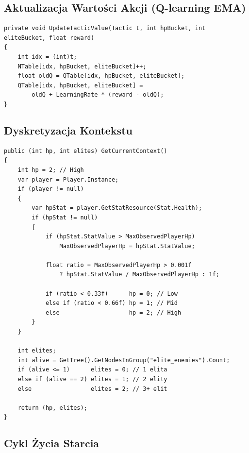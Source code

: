 \subsection{Aktualizacja Wartości Akcji (Q-learning EMA)}

\begin{lstlisting}[caption={EliteBrain.UpdateTacticValue},label={lst:eb-update}]
private void UpdateTacticValue(Tactic t, int hpBucket, int eliteBucket, float reward)
{
    int idx = (int)t;
    NTable[idx, hpBucket, eliteBucket]++;
    float oldQ = QTable[idx, hpBucket, eliteBucket];
    QTable[idx, hpBucket, eliteBucket] =
        oldQ + LearningRate * (reward - oldQ);
}
\end{lstlisting}

\subsection{Dyskretyzacja Kontekstu}

\begin{lstlisting}[caption={EliteBrain.GetCurrentContext - kubelki HP i liczby elit},label={lst:eb-ctx}]
public (int hp, int elites) GetCurrentContext()
{
    int hp = 2; // High
    var player = Player.Instance;
    if (player != null)
    {
        var hpStat = player.GetStatResource(Stat.Health);
        if (hpStat != null)
        {
            if (hpStat.StatValue > MaxObservedPlayerHp)
                MaxObservedPlayerHp = hpStat.StatValue;

            float ratio = MaxObservedPlayerHp > 0.001f
                ? hpStat.StatValue / MaxObservedPlayerHp : 1f;

            if (ratio < 0.33f)      hp = 0; // Low
            else if (ratio < 0.66f) hp = 1; // Mid
            else                    hp = 2; // High
        }
    }

    int elites;
    int alive = GetTree().GetNodesInGroup("elite_enemies").Count;
    if (alive <= 1)      elites = 0; // 1 elita
    else if (alive == 2) elites = 1; // 2 elity
    else                 elites = 2; // 3+ elit

    return (hp, elites);
}
\end{lstlisting}

\subsection{Cykl Życia Starcia}

